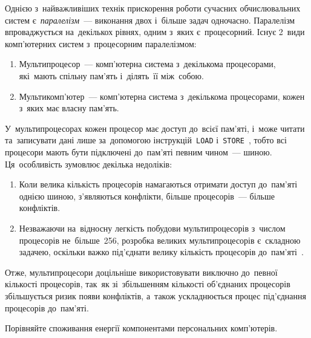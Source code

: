 \documentclass[
	a4paper,
	oneside,
	BCOR = 10mm,
	DIV = 12,
	12pt,
	headings = normal,
	bibliography = totoc,
]{scrartcl}
\begin{document}
	\begin{solution}
		Однією з~найважливіших технік прискорення роботи сучасних обчислювальних систем є~\emph{паралелізм}~— виконання двох і~більше задач одночасно. Паралелізм впроваджується на~декількох рівнях, одним з~яких є~процесорний. Існує 2~види комп'ютерних систем з~процесорним паралелізмом: 
		\begin{enumerate}[itemsep = 1\baselineskip]
			\item Мультипроцесор~— комп'ютерна система з~декількома процесорами, які~мають спільну пам'ять і~ділять~її між~собою. 
			\item Мультикомп'ютер~— комп'ютерна система з~декількома процесорами, кожен з~яких має власну пам'ять. 
		\end{enumerate}

		У~мультипроцесорах кожен процесор має доступ до~всієї пам'\-я\-ті, і~може читати та~записувати дані лише за~допомогою інструкцій~\texttt{LOAD} і~\texttt{STORE}~\cite[586]{tanenbaum-structured-comp-org}, тобто всі процесори мають бути підключені до~пам'яті певним чином~— шиною. Ця~особливість зумовлює декілька недоліків: 
		\begin{enumerate}[itemsep = 1\baselineskip]
			\item Коли велика кількість процесорів намагаються отримати доступ до~пам'яті однією шиною, з'являються конфлікти, більше процесорів~— більше конфліктів. 
			\item Незважаючи на~відносну легкість побудови мультипроцесорів з~числом процесорів не~більше~256, розробка великих мультипроцесорів є~складною задачею, оскільки важко під'єднати велику кількість процесорів до~пам'яті~\cite[73]{tanenbaum-structured-comp-org}. 
		\end{enumerate}

		Отже, мультипроцесори доцільніше використовувати виключно до~певної кількості процесорів, так~як зі~збільшенням кількості об'єднаних процесорів збільшується ризик появи конфліктів, а~також ускладнюється процес під'єднання процесорів до~пам'яті. 
	\end{solution}
		
	\begin{exercise}
		Порівняйте споживання енергії компонентами персональних комп'ютерів.
	\end{exercise}
\end{document}
